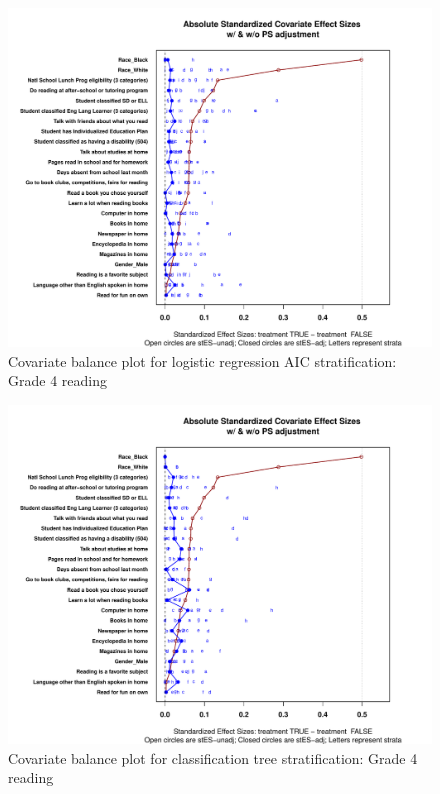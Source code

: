 \begin{figure}
\begin{center}
\includegraphics[width=\textwidth]{../Figures2009/g4read-lrAIC-balance.pdf}
\caption{Covariate balance plot for logistic regression AIC stratification: Grade 4 reading}
\end{center}
\end{figure}

\begin{figure}
\begin{center}
\includegraphics[width=\textwidth]{../Figures2009/g4read-tree-balance.pdf}
\caption{Covariate balance plot for classification tree stratification: Grade 4 reading}
\end{center}
\end{figure}


